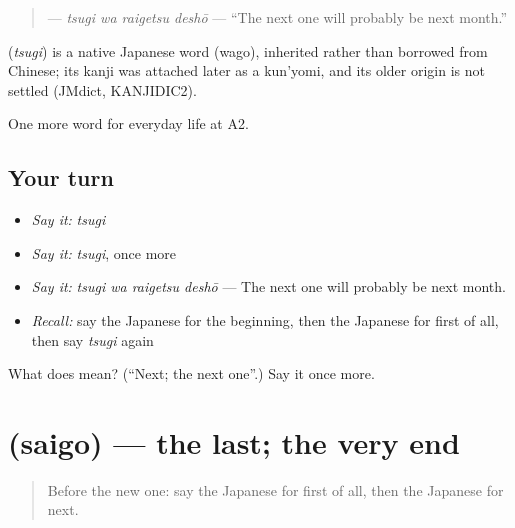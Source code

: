 \begin{quote}
\textbf{ } — \emph{tsugi wa raigetsu deshō} — \textquotedblleft{}The next one will probably be next month.\textquotedblright{}
\end{quote}

\begin{cousinweb}
\textbf{} (\emph{tsugi}) is a native Japanese word (wago), inherited rather than borrowed from Chinese; its kanji was attached later as a kun'yomi, and its older origin is not settled (JMdict, KANJIDIC2).
\end{cousinweb}

\begin{grammarlens}[title={What you've built}]
One more word for everyday life at A2.
\end{grammarlens}

\subsection*{Your turn}
\begin{itemize}
\raggedright
  \item \emph{Say it:} \emph{tsugi}
  \item \emph{Say it:} \emph{tsugi}, once more
  \item \emph{Say it:} \emph{tsugi wa raigetsu deshō} — The next one will probably be next month.
  \item \emph{Recall:} say the Japanese for the beginning, then the Japanese for first of all, then say \emph{tsugi} again
\end{itemize}

\begin{tcolorbox}[breakable,colback=teal!4,colframe=teal!35!black,title={Before you move on}]
What does  mean? (\textquotedblleft{}Next; the next one\textquotedblright{}.) Say it once more.
\end{tcolorbox}
\section[\texorpdfstring{\ja{さいご} (saigo)}{さいご (saigo)}]{ (saigo) — the last; the very end}

\label{lesson:JA-C171-saigo}



\begin{quote}
Before the new one: say the Japanese for first of all, then the Japanese for next.
\end{quote}

